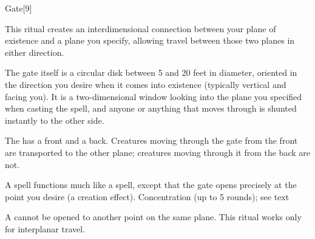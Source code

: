 \begin{spellsection}{Gate}[9]
    \begin{spellheader}
    \end{spellheader}
    \begin{spellcontent}
        \begin{spelltargetinginfo}
            \spellrng{\rngmed}
        \end{spelltargetinginfo}
        \begin{spelleffects}

            \spellline
            \spelleffect This ritual creates an interdimensional connection between your plane of existence and a plane you specify, allowing travel between those two planes in either direction.
            \par The gate itself is a circular disk between 5 and 20 feet in diameter, oriented in the direction you desire when it comes into existence (typically vertical and facing you). It is a two-dimensional window looking into the plane you specified when casting the spell, and anyone or anything that moves through is shunted instantly to the other side.
            \par The  has a front and a back. Creatures moving through the gate from the front are transported to the other plane; creatures moving through it from the back are not.
            \par A  spell functions much like a  spell, except that the gate opens precisely at the point you desire (a creation effect).
            \spelldur Concentration (up to 5 rounds); see text
        \end{spelleffects}
    \end{spellcontent}
    \begin{spellfooter}
        \spellnotes A  cannot be opened to another point on the same plane. This ritual works only for interplanar travel.
    \end{spellfooter}
\end{spellsection}

